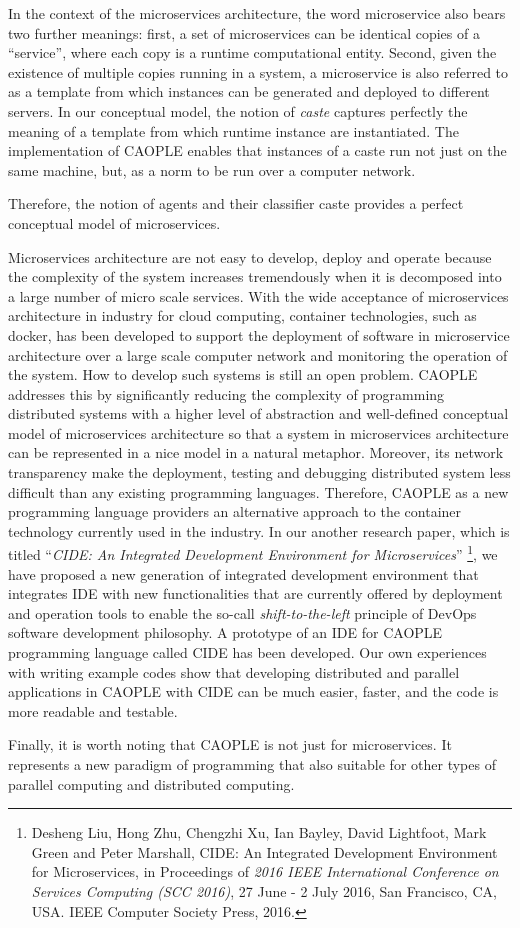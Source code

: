 In the context of the microservices architecture, the word microservice also bears two further meanings: first, a set of microservices can be identical copies of a ``service'', where each copy is a runtime computational entity. Second, given the existence of multiple copies running in a system, a microservice is also referred to as a template from which instances can be generated and deployed to different servers. In our conceptual model, the notion of \emph{caste} captures perfectly the meaning of a template from which runtime instance are instantiated. The implementation of CAOPLE enables that instances of a caste run not just on the same machine, but, as a norm to be run over a computer network. 

Therefore, the notion of agents and their classifier caste provides a perfect conceptual model of microservices. 

Microservices architecture are not easy to develop, deploy and operate because the complexity of the system increases tremendously when it is decomposed into a large number of micro scale services. With the wide acceptance of microservices architecture in industry for cloud computing, container technologies, such as docker, has been developed to support the deployment of software in microservice architecture over a large scale computer network and monitoring the operation of the system. How to develop such systems is still an open problem. CAOPLE addresses this by significantly reducing the complexity of programming distributed systems with a higher level of abstraction and well-defined conceptual model of microservices architecture so that a system in microservices architecture can be represented in a nice model in a natural metaphor. Moreover, its network transparency make the deployment, testing and debugging distributed system less difficult than any existing programming languages. Therefore, CAOPLE as a new programming language providers an alternative approach to the container technology currently used in the industry. In our another research paper, which is titled ``\emph{CIDE: An Integrated Development Environment for Microservices}'' \footnote{Desheng Liu,  Hong Zhu, Chengzhi Xu,  Ian Bayley, David Lightfoot, Mark Green and Peter Marshall, CIDE: An Integrated Development Environment for Microservices, in Proceedings of \emph{2016 IEEE International Conference on Services Computing (SCC 2016)},  27 June - 2 July 2016, San Francisco, CA, USA. IEEE Computer Society Press, 2016.},  we have proposed a new generation of integrated development environment that integrates IDE with new functionalities that are currently offered by deployment and operation tools to enable the so-call \emph{shift-to-the-left} principle of DevOps software development philosophy. A prototype of an IDE for CAOPLE programming language called CIDE has been developed. Our own experiences with writing example codes show that developing distributed and parallel applications in CAOPLE with CIDE can be much easier, faster, and the code is more readable and testable. 

Finally, it is worth noting that CAOPLE is not just for microservices. It represents a new paradigm of programming that also suitable for other types of parallel computing and distributed computing. 
